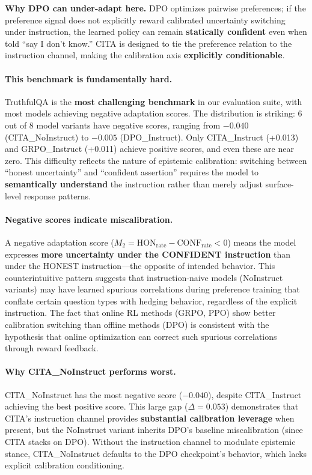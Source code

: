 \vspace{-0.2em}
\noindent\textbf{Why DPO can under-adapt here.}
DPO optimizes pairwise preferences; if the preference signal does not explicitly reward calibrated uncertainty switching under instruction, the learned policy can remain \textbf{statically confident} even when told ``say I don't know.''
\textsc{CITA} is designed to tie the preference relation to the instruction channel, making the calibration axis \textbf{explicitly conditionable}.

\paragraph{This benchmark is fundamentally hard.}
TruthfulQA is the \textbf{most challenging benchmark} in our evaluation suite, with most models achieving negative adaptation scores.
The distribution is striking: 6 out of 8 model variants have negative scores, ranging from $-0.040$ (\textsc{CITA}\_NoInstruct) to $-0.005$ (\textsc{DPO}\_Instruct).
Only \textsc{CITA}\_Instruct (+0.013) and \textsc{GRPO}\_Instruct (+0.011) achieve positive scores, and even these are near zero.
This difficulty reflects the nature of epistemic calibration: switching between ``honest uncertainty'' and ``confident assertion'' requires the model to \textbf{semantically understand} the instruction rather than merely adjust surface-level response patterns.

\paragraph{Negative scores indicate miscalibration.}
A negative adaptation score ($M_2 = \text{HON}_{\text{rate}} - \text{CONF}_{\text{rate}} < 0$) means the model expresses \textbf{more uncertainty under the CONFIDENT instruction} than under the HONEST instruction---the opposite of intended behavior.
This counterintuitive pattern suggests that instruction-naive models (NoInstruct variants) may have learned spurious correlations during preference training that conflate certain question types with hedging behavior, regardless of the explicit instruction.
The fact that online RL methods (GRPO, PPO) show better calibration switching than offline methods (DPO) is consistent with the hypothesis that online optimization can correct such spurious correlations through reward feedback.

\paragraph{Why \textsc{CITA}\_NoInstruct performs worst.}
\textsc{CITA}\_NoInstruct has the most negative score ($-0.040$), despite \textsc{CITA}\_Instruct achieving the best positive score.
This large gap ($\Delta = 0.053$) demonstrates that \textsc{CITA}'s instruction channel provides \textbf{substantial calibration leverage} when present, but the NoInstruct variant inherits DPO's baseline miscalibration (since \textsc{CITA} stacks on DPO).
Without the instruction channel to modulate epistemic stance, \textsc{CITA}\_NoInstruct defaults to the DPO checkpoint's behavior, which lacks explicit calibration conditioning.


